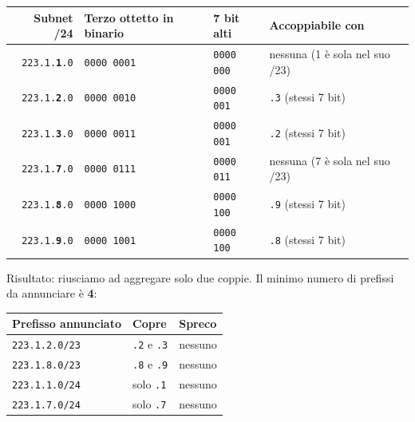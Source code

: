 \documentclass[a4paper,12pt]{report}
\begin{document}
\begin{center}
\begin{tabular}{rlll}
\toprule
\textbf{Subnet /24} & \textbf{Terzo ottetto in binario}
    & \textbf{7 bit alti} & \textbf{Accoppiabile con} \\
\midrule
\texttt{223.1.\textbf{1}.0}
    & \texttt{0000 000\textcolor{alertred}{1}}
    & \texttt{0000 000}
    & nessuna (1 è sola nel suo /23) \\
\texttt{223.1.\textbf{2}.0}
    & \texttt{0000 001\textcolor{alertred}{0}}
    & \texttt{0000 001}
    & \texttt{.3} (stessi 7 bit) \\
\texttt{223.1.\textbf{3}.0}
    & \texttt{0000 001\textcolor{alertred}{1}}
    & \texttt{0000 001}
    & \texttt{.2} (stessi 7 bit) \\
\texttt{223.1.\textbf{7}.0}
    & \texttt{0000 011\textcolor{alertred}{1}}
    & \texttt{0000 011}
    & nessuna (7 è sola nel suo /23) \\
\texttt{223.1.\textbf{8}.0}
    & \texttt{0000 100\textcolor{alertred}{0}}
    & \texttt{0000 100}
    & \texttt{.9} (stessi 7 bit) \\
\texttt{223.1.\textbf{9}.0}
    & \texttt{0000 100\textcolor{alertred}{1}}
    & \texttt{0000 100}
    & \texttt{.8} (stessi 7 bit) \\
\bottomrule
\end{tabular}
\end{center}

\noindent Risultato: riusciamo ad aggregare solo due coppie.
Il minimo numero di prefissi da annunciare è \textbf{4}:

\begin{center}
\begin{tabular}{lll}
\toprule
\textbf{Prefisso annunciato} & \textbf{Copre} &
\textbf{Spreco} \\
\midrule
\texttt{223.1.2.0/23} & \texttt{.2} e \texttt{.3} & nessuno \\
\texttt{223.1.8.0/23} & \texttt{.8} e \texttt{.9} & nessuno \\
\texttt{223.1.1.0/24} & solo \texttt{.1} & nessuno \\
\texttt{223.1.7.0/24} & solo \texttt{.7} & nessuno \\
\bottomrule
\end{tabular}
\end{center}
\end{document}
